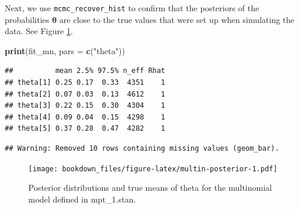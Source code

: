 \documentclass[12pt,]{krantz}
\newenvironment{Shaded}{\begin{snugshade}}{\end{snugshade}}
\newcommand{\KeywordTok}[1]{\textcolor[rgb]{0.13,0.29,0.53}{\textbf{#1}}}
\newcommand{\DataTypeTok}[1]{\textcolor[rgb]{0.13,0.29,0.53}{#1}}
\newcommand{\DecValTok}[1]{\textcolor[rgb]{0.00,0.00,0.81}{#1}}
\newcommand{\StringTok}[1]{\textcolor[rgb]{0.31,0.60,0.02}{#1}}
\newcommand{\CommentTok}[1]{\textcolor[rgb]{0.56,0.35,0.01}{\textit{#1}}}
\newcommand{\OperatorTok}[1]{\textcolor[rgb]{0.81,0.36,0.00}{\textbf{#1}}}
\newcommand{\NormalTok}[1]{#1}
\theoremstyle{definition}
\theoremstyle{definition}
\theoremstyle{definition}
\theoremstyle{remark}
\begin{document}
Next, we use \texttt{mcmc\_recover\_hist} to confirm that the posteriors
of the probabilities \(\boldsymbol{\theta}\) are close to the true
values that were set up when simulating the data. See Figure
\ref{fig:multin-posterior}.

\begin{Shaded}
\begin{Highlighting}[]
\KeywordTok{print}\NormalTok{(fit_mn, }\DataTypeTok{pars =} \KeywordTok{c}\NormalTok{(}\StringTok{"theta"}\NormalTok{))}
\end{Highlighting}
\end{Shaded}

\begin{verbatim}
##          mean 2.5% 97.5% n_eff Rhat
## theta[1] 0.25 0.17  0.33  4351    1
## theta[2] 0.07 0.03  0.13  4612    1
## theta[3] 0.22 0.15  0.30  4304    1
## theta[4] 0.09 0.04  0.15  4298    1
## theta[5] 0.37 0.28  0.47  4282    1
\end{verbatim}

\begin{Shaded}
\end{Shaded}

\begin{verbatim}
## Warning: Removed 10 rows containing missing values (geom_bar).
\end{verbatim}

\begin{figure}
\centering
\texttt{[image: bookdown\_files/figure-latex/multin-posterior-1.pdf]}
\caption{\label{fig:multin-posterior}Posterior distributions and true means
of theta for the multinomial model defined in mpt\_1.stan.}
\end{figure}
\end{document}
